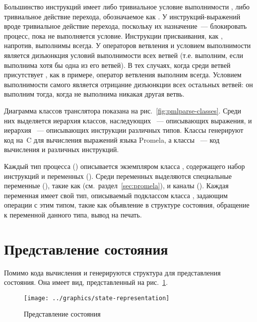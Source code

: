 Большинство инструкций имеет либо тривиальное условие выполнимости , либо
тривиальное действие перехода, обозначаемое как . У инструкций-выражений вроде
 тривиальное действие перехода, поскольку их назначение~--- блокировать
процесс, пока не выполняется условие. Инструкции присваивания, как , напротив,
выполнимы всегда. У операторов ветвления  и  условием выполнимости
является дизъюнкция условий выполнимости всех ветвей (т.е.  выполним, если
выполнима хотя бы одна из его ветвей). В тех случаях, когда среди ветвей присутствует
, как в примере, оператор ветвления выполним всегда. Условием выполнимости
самого  является отрицание дизъюнкции всех остальных ветвей: он выполним тогда,
когда не выполнима никакая другая ветвь.  

Диаграмма классов транслятора показана на рис.~\ref{fig:pmlparse-classes}. Среди них
выделяется иерархия классов, наследующих ~--- описывающих выражения, и
иерархия ~--- описывающих инструкции различных типов. Классы
 генерируют код на~C для вычисления выражений языка Promela, а классы
~--- код вычисления  и  различных инструкций.

Каждый тип процесса () описывается экземпляром класса ,
содержащего набор инструкций и переменных (). Среди переменных выделяются
специальные переменные (), такие как 
(см.~раздел~\ref{sec:promela}), и каналы (). Каждая переменная имеет свой
тип, описываемый подклассом класса , задающим операции с этим типом, такие как
объявление в структуре состояния, обращение к переменной данного типа, вывод на
печать\etc.

\section{Представление состояния}
\label{sec:state-represent}

Помимо кода вычисления  и  генерируются структура 
для представления состояния. Она имеет вид, представленный на рис.~\ref{fig:state-repr}.

\begin{figure}[ht]
  \centering
  \texttt{[image: ../graphics/state-representation]}  
  \caption{Представление состояния}
  \label{fig:state-repr}
\end{figure}

